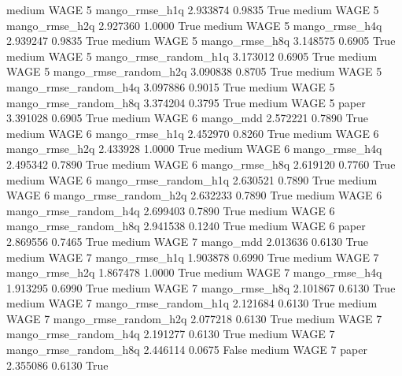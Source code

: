     medium     WAGE                 5        mango_rmse_h1q   2.933874      0.9835    True
    medium     WAGE                 5        mango_rmse_h2q   2.927360      1.0000    True
    medium     WAGE                 5        mango_rmse_h4q   2.939247      0.9835    True
    medium     WAGE                 5        mango_rmse_h8q   3.148575      0.6905    True
    medium     WAGE                 5 mango_rmse_random_h1q   3.173012      0.6905    True
    medium     WAGE                 5 mango_rmse_random_h2q   3.090838      0.8705    True
    medium     WAGE                 5 mango_rmse_random_h4q   3.097886      0.9015    True
    medium     WAGE                 5 mango_rmse_random_h8q   3.374204      0.3795    True
    medium     WAGE                 5                 paper   3.391028      0.6905    True
    medium     WAGE                 6             mango_mdd   2.572221      0.7890    True
    medium     WAGE                 6        mango_rmse_h1q   2.452970      0.8260    True
    medium     WAGE                 6        mango_rmse_h2q   2.433928      1.0000    True
    medium     WAGE                 6        mango_rmse_h4q   2.495342      0.7890    True
    medium     WAGE                 6        mango_rmse_h8q   2.619120      0.7760    True
    medium     WAGE                 6 mango_rmse_random_h1q   2.630521      0.7890    True
    medium     WAGE                 6 mango_rmse_random_h2q   2.632233      0.7890    True
    medium     WAGE                 6 mango_rmse_random_h4q   2.699403      0.7890    True
    medium     WAGE                 6 mango_rmse_random_h8q   2.941538      0.1240    True
    medium     WAGE                 6                 paper   2.869556      0.7465    True
    medium     WAGE                 7             mango_mdd   2.013636      0.6130    True
    medium     WAGE                 7        mango_rmse_h1q   1.903878      0.6990    True
    medium     WAGE                 7        mango_rmse_h2q   1.867478      1.0000    True
    medium     WAGE                 7        mango_rmse_h4q   1.913295      0.6990    True
    medium     WAGE                 7        mango_rmse_h8q   2.101867      0.6130    True
    medium     WAGE                 7 mango_rmse_random_h1q   2.121684      0.6130    True
    medium     WAGE                 7 mango_rmse_random_h2q   2.077218      0.6130    True
    medium     WAGE                 7 mango_rmse_random_h4q   2.191277      0.6130    True
    medium     WAGE                 7 mango_rmse_random_h8q   2.446114      0.0675   False
    medium     WAGE                 7                 paper   2.355086      0.6130    True
